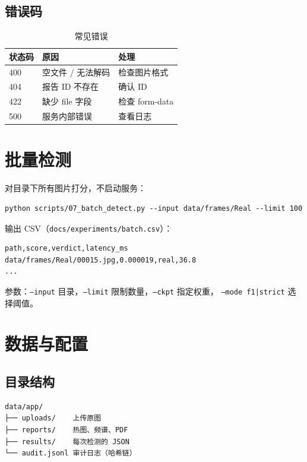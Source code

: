 \documentclass[12pt,a4paper]{article}
\begin{document}
\subsection{错误码}

\begin{table}[H]
\centering
\caption{常见错误}
\small
\begin{tabular}{lll}
\toprule
状态码 & 原因 & 处理 \\
\midrule
400 & 空文件 / 无法解码 & 检查图片格式 \\
404 & 报告 ID 不存在 & 确认 ID \\
422 & 缺少 file 字段 & 检查 form-data \\
500 & 服务内部错误 & 查看日志 \\
\bottomrule
\end{tabular}
\end{table}

\section{批量检测}

对目录下所有图片打分，不启动服务：

\begin{lstlisting}
python scripts/07_batch_detect.py --input data/frames/Real --limit 100
\end{lstlisting}

输出 CSV（\texttt{docs/experiments/batch.csv}）：

\begin{lstlisting}
path,score,verdict,latency_ms
data/frames/Real/00015.jpg,0.000019,real,36.8
...
\end{lstlisting}

参数：\texttt{--input} 目录，\texttt{--limit} 限制数量，\texttt{--ckpt} 指定权重，
\texttt{--mode f1|strict} 选择阈值。

\section{数据与配置}

\subsection{目录结构}

\begin{lstlisting}
data/app/
├── uploads/    上传原图
├── reports/    热图、频谱、PDF
├── results/    每次检测的 JSON
└── audit.jsonl 审计日志（哈希链）
\end{lstlisting}
\end{document}
